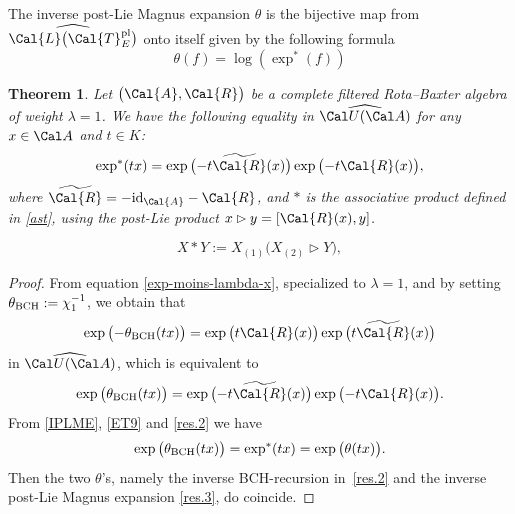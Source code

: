 \documentclass[10pt,a4paper]{article}
\numberwithin{equation}{section}
\newtheorem{Theorem}{Theorem}[section]
\begin{document}
The inverse post-Lie Magnus expansion $\theta$ is the bijective map from $\widehat{\Cal{L}\big(\Cal{T}^{\rm pl}_E\big)}$ onto itself given by the following formula
\begin{equation}\label{IPLME}
\theta(f) = \log(\exp^*(f))
\end{equation}

\begin{Theorem}\label{T9}
Let $\big(\Cal{A}, \Cal{R}\big)$ be a complete filtered Rota--Baxter algebra of weight $\lambda = 1$. We have the following equality in $\widehat{\Cal U(\Cal A)}$ for any $x\in\Cal A$ and $t \in K$:
\begin{equation}\label{ET9}
\exp^{\ast}(tx) = \exp\big({-}t \widetilde{\Cal{R}}(x)\big) \exp\big({-}t \Cal{R}(x)\big),
\end{equation}
where $\widetilde{\Cal{R}}= -{\rm id}_{\Cal{A}}-\Cal{R}$, and $\ast$ is the associative product defined in \eqref{ast}, using the post-Lie product $x \rhd y = [\Cal{R}(x), y]$.
\end{Theorem}

\begin{equation}\label{ast}
X \ast Y := X_{(1)}\big(X_{(2)} \rhd Y\big),
\end{equation}

\begin{proof}
From equation \eqref{exp-moins-lambda-x}, specialized to $\lambda=1$, and by setting $\theta_{\rm BCH} :=\chi_{1}^{-1}$, we obtain that
\begin{displaymath}
\exp\big({-}\theta_{\rm BCH}(tx)\big)
= \exp\big(t \Cal{R}(x)\big) \exp\big(t \widetilde{\Cal{R}}(x)\big)
\end{displaymath}
in $\widehat{\Cal U(\Cal A)}$, which is equivalent to
\begin{equation}\label{res.2}
\exp\big(\theta_{\rm BCH}(tx)\big)
= \exp\big({-}t \widetilde{\Cal{R}}(x)\big) \exp\big({-}t \Cal{R}(x)\big).
\end{equation}
From \eqref{IPLME}, \eqref{ET9} and \eqref{res.2} we have
\begin{equation}\label{res.3}
\exp\big(\theta_{\rm BCH}(tx)\big) = \exp^{\ast}(tx)= \exp\big(\theta(tx)\big).
\end{equation}
Then the two $\theta$'s, namely the inverse BCH-recursion in~\eqref{res.2} and the inverse post-Lie Magnus expansion \eqref{res.3}, do coincide.
\end{proof}
\end{document}

